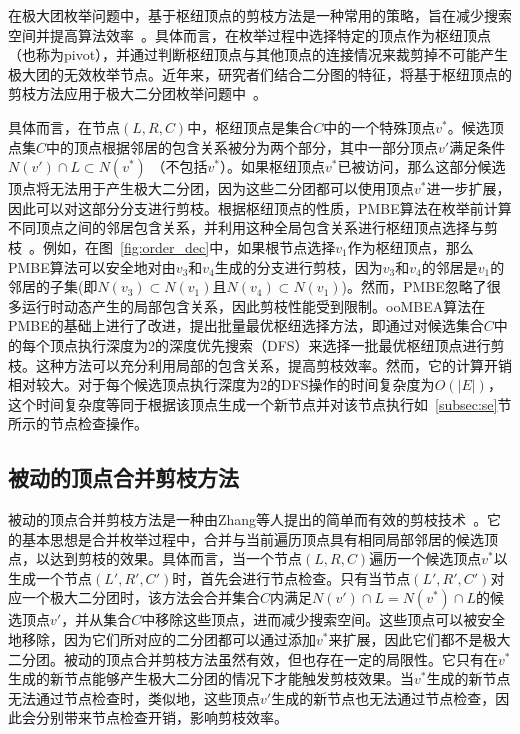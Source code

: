 在极大团枚举问题中，基于枢纽顶点的剪枝方法是一种常用的策略，旨在减少搜索空间并提高算法效率~\cite{MCEdegeneracy10}。具体而言，在枚举过程中选择特定的顶点作为枢纽顶点（也称为pivot），并通过判断枢纽顶点与其他顶点的连接情况来裁剪掉不可能产生极大团的无效枚举节点。近年来，研究者们结合二分图的特征，将基于枢纽顶点的剪枝方法应用于极大二分团枚举问题中~\cite{PMBE20,ooMBE22}。

具体而言，在节点$(L,R,C)$中，枢纽顶点是集合$C$中的一个特殊顶点$v^*$。候选顶点集$C$中的顶点根据邻居的包含关系被分为两个部分，其中一部分顶点$v'$满足条件$N(v') \cap L \subset N(v^*)$ （不包括$v^*$）。如果枢纽顶点$v^*$已被访问，那么这部分候选顶点将无法用于产生极大二分团，因为这些二分团都可以使用顶点$v^*$进一步扩展，因此可以对这部分分支进行剪枝。根据枢纽顶点的性质，PMBE算法在枚举前计算不同顶点之间的邻居包含关系，并利用这种全局包含关系进行枢纽顶点选择与剪枝~\cite{PMBE20}。例如，在图~\ref{fig:order_dec}中，如果根节点选择$v_1$作为枢纽顶点，那么PMBE算法可以安全地对由$v_3$和$v_4$生成的分支进行剪枝，因为$v_3$和$v_4$的邻居是$v_1$的邻居的子集(即$N(v_3)\subset N(v_1)$且$N(v_4)\subset N(v_1)$)。然而，PMBE忽略了很多运行时动态产生的局部包含关系，因此剪枝性能受到限制。ooMBEA算法在PMBE的基础上进行了改进，提出批量最优枢纽选择方法，即通过对候选集合$C$中的每个顶点执行深度为2的深度优先搜索（DFS）来选择一批最优枢纽顶点进行剪枝。这种方法可以充分利用局部的包含关系，提高剪枝效率。然而，它的计算开销相对较大。对于每个候选顶点执行深度为2的DFS操作的时间复杂度为$O(|E|)$，这个时间复杂度等同于根据该顶点生成一个新节点并对该节点执行如~\ref{subsec:se}节所示的节点检查操作。


\subsection{被动的顶点合并剪枝方法}
\label{subsec:pmp}

被动的顶点合并剪枝方法是一种由Zhang等人提出的简单而有效的剪枝技术~\cite{iMBEA14}。它的基本思想是合并枚举过程中，合并与当前遍历顶点具有相同局部邻居的候选顶点，以达到剪枝的效果。具体而言，当一个节点$(L, R, C)$遍历一个候选顶点$v^*$以生成一个节点$(L', R', C')$时，首先会进行节点检查。只有当节点$(L', R', C')$对应一个极大二分团时，该方法会合并集合$C$内满足$N(v') \cap L = N(v^*) \cap L$的候选顶点$v'$，并从集合$C$中移除这些顶点，进而减少搜索空间。这些顶点可以被安全地移除，因为它们所对应的二分团都可以通过添加$v^*$来扩展，因此它们都不是极大二分团。被动的顶点合并剪枝方法虽然有效，但也存在一定的局限性。它只有在$v^*$生成的新节点能够产生极大二分团的情况下才能触发剪枝效果。当$v^*$生成的新节点无法通过节点检查时，类似地，这些顶点$v'$生成的新节点也无法通过节点检查，因此会分别带来节点检查开销，影响剪枝效率。

